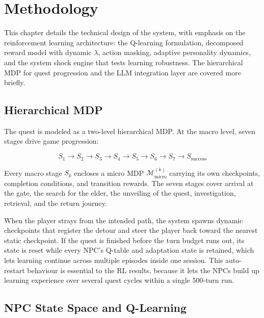 \documentclass[12pt, a4paper, oneside]{report}
\begin{document}
\chapter{Methodology}
\label{chap:methodology}

This chapter details the technical design of the system, with emphasis on the reinforcement learning architecture: the Q-learning formulation, decomposed reward model with dynamic $\lambda$, action masking, adaptive personality dynamics, and the system shock engine that tests learning robustness. The hierarchical MDP for quest progression and the LLM integration layer are covered more briefly.

\section{Hierarchical MDP}
\label{sec:hierarchical-mdp}

The quest is modeled as a two-level hierarchical MDP. At the macro level, seven stages drive game progression:

\begin{equation}
    S_1 \to S_2 \to S_3 \to S_4 \to S_5 \to S_6 \to S_7 \to S_{\text{success}}
\end{equation}

Every macro stage $S_k$ encloses a micro MDP $\mathcal{M}_{\text{micro}}^{(k)}$ carrying its own checkpoints, completion conditions, and transition rewards. The seven stages cover arrival at the gate, the search for the elder, the unveiling of the quest, investigation, retrieval, and the return journey.

When the player strays from the intended path, the system spawns dynamic checkpoints that register the detour and steer the player back toward the nearest static checkpoint. If the quest is finished before the turn budget runs out, its state is reset while every NPC's Q-table and adaptation state is retained, which lets learning continue across multiple episodes inside one session. This auto-restart behaviour is essential to the RL results, because it lets the NPCs build up learning experience over several quest cycles within a single 500-turn run.

\section{NPC State Space and Q-Learning}
\label{sec:q-learning}
\end{document}

